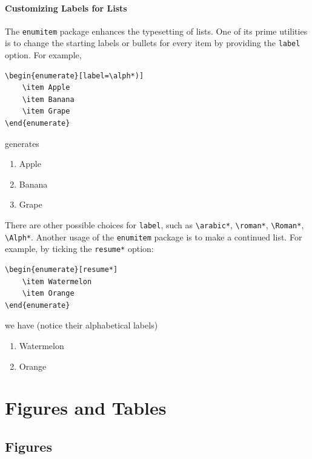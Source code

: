 \paragraph{Customizing Labels for Lists}
The \verb|enumitem| package enhances the typesetting of lists. One of its prime utilities is to change the starting labels or bullets for every item by providing the \verb|label| option. For example,
\begin{lstlisting}
\begin{enumerate}[label=\alph*)]
    \item Apple
    \item Banana
    \item Grape
\end{enumerate}
\end{lstlisting}
generates
\begin{enumerate}[label=\alph*)]
    \item Apple
    \item Banana
    \item Grape
\end{enumerate}
There are other possible choices for \verb|label|, such as \texttt{\textbackslash arabic*}, \texttt{\textbackslash roman*}, \texttt{\textbackslash Roman*}, \texttt{\textbackslash Alph*}. Another usage of the \verb|enumitem| package is to make a continued list. For example, by ticking the \verb|resume*| option:
\begin{lstlisting}
\begin{enumerate}[resume*]
    \item Watermelon
    \item Orange
\end{enumerate}    
\end{lstlisting}
we have (notice their alphabetical labels)
\begin{enumerate}[resume*]
    \item Watermelon
    \item Orange
\end{enumerate}

\section{Figures and Tables}

\subsection{Figures}

